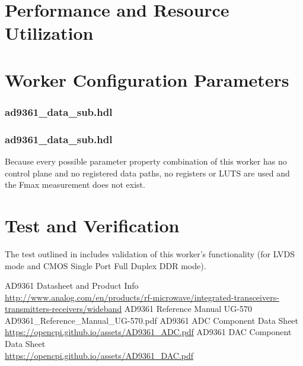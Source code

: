 \documentclass{article}
\def\comp{ad9361\_data\_sub}
\edef\ecomp{ad9361_data_sub}
\begin{document}
\begin{landscape}
\section*{Performance and Resource Utilization}
\section*{Worker Configuration Parameters}
\subsubsection*{\comp.hdl}

\subsubsection*{\comp.hdl}
Because every possible parameter property combination of this worker has no control plane and no registered data paths, no registers or LUTS are used and the Fmax measurement does not exist. \\

\end{landscape}

\section*{Test and Verification}
The test outlined in \cite{dac_comp_datasheet} includes validation of this worker's functionality (for LVDS mode and CMOS Single Port Full Duplex DDR mode).

  \begin{thebibliography}{1}

 AD9361 Datasheet and Product Info \\
\url{http://www.analog.com/en/products/rf-microwave/integrated-transceivers-transmitters-receivers/wideband}
   AD9361 Reference Manual UG-570\\
  AD9361\_Reference\_Manual\_UG-570.pdf
  AD9361 ADC Component Data Sheet \\
 \url{https://opencpi.github.io/assets/AD9361_ADC.pdf}
  AD9361 DAC Component Data Sheet \\
 \url{https://opencpi.github.io/assets/AD9361_DAC.pdf}

  \end{thebibliography}
\end{document}

